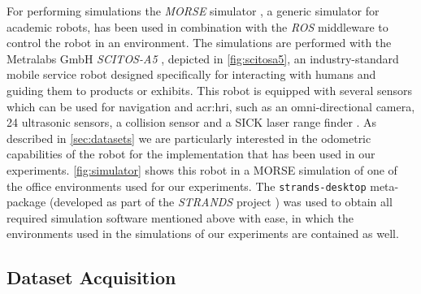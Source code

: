 For performing simulations the \textit{MORSE} simulator \cite{morse_simpar_2012}, a generic simulator for academic robots, has been used in combination with the \textit{ROS} middleware to control the robot in an environment.
The simulations are performed with the Metralabs GmbH \textit{SCITOS-A5} \cite{Metralabs}, depicted in \autoref{fig:scitosa5}, an industry-standard mobile service robot designed specifically for interacting with humans and guiding them to products or exhibits.
This robot is equipped with several sensors which can be used for navigation and \acrfull{acr:hri}, such as an omni-directional camera, 24 ultrasonic sensors, a collision sensor and a SICK laser range finder \cite{gross2008shopbot}.
As described in \autoref{sec:datasets} we are particularly interested in the odometric capabilities of the robot for the implementation that has been used in our experiments.
\autoref{fig:simulator} shows this robot in a MORSE simulation of one of the office environments used for our experiments.
The \texttt{strands-desktop} meta-package (developed as part of the \textit{STRANDS} project \cite{hawes2016strands}) was used to obtain all required simulation software mentioned above with ease, in which the environments used in the simulations of our experiments are contained as well.


\subsection{Dataset Acquisition}
\label{sec:datasets}

